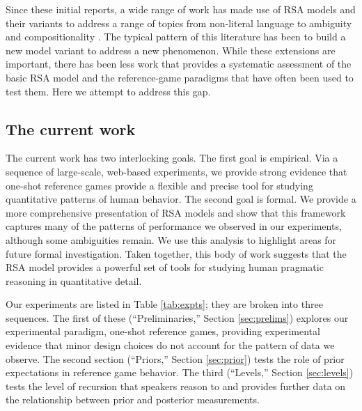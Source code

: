 \documentclass[man,noapacite]{apa2}
\begin{document}
Since these initial reports, a wide range of work has made use of RSA models and their variants to address a range of topics from non-literal language \cite{kao2014} to ambiguity \cite{lassiter2015} and compositionality \cite{potts2015}. The typical pattern of this literature has been to build a new model variant to address a new phenomenon. While these extensions are important, there has been less work that provides a systematic assessment of the basic RSA model and the reference-game paradigms that have often been used to test them. Here we attempt to address this gap.

\subsection{The current work}

The current work has two interlocking goals. The first goal is empirical. Via a sequence of large-scale, web-based experiments, we provide strong evidence that one-shot reference games provide a flexible and precise tool for studying quantitative patterns of human behavior. The second goal is formal. We provide a more comprehensive presentation of RSA models and show that this framework captures many of the patterns of performance we observed in our experiments, although some ambiguities remain. We use this analysis to highlight areas for future formal investigation. Taken together, this body of work suggests that the RSA model provides a powerful set of tools for studying human pragmatic reasoning in quantitative detail.

Our experiments are listed in Table \ref{tab:expts}; they are broken into three sequences. The first of these (``Preliminaries,'' Section \ref{sec:prelims}) explores our experimental paradigm, one-shot reference games, providing experimental evidence that minor design choices do not account for the pattern of data we observe. The second section (``Priors,'' Section \ref{sec:prior}) tests the role of prior expectations in reference game behavior. The third (``Levels,'' Section \ref{sec:levels}) tests the level of recursion that speakers reason to and provides further data on the relationship between prior and posterior measurements.
\end{document}
